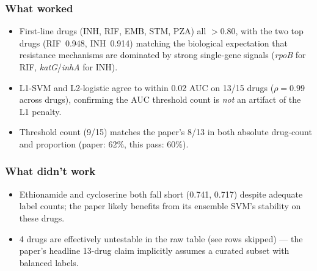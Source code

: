 \documentclass[11pt,letterpaper]{article}
\begin{document}
\subsubsection*{What worked}
\begin{itemize}
  \item First-line drugs (INH, RIF, EMB, STM, PZA) all $>0.80$, with the two
        top drugs (RIF~0.948, INH~0.914) matching the biological expectation
        that resistance mechanisms are dominated by strong single-gene signals
        (\emph{rpoB} for RIF, \emph{katG}/\emph{inhA} for INH).
  \item L1-SVM and L2-logistic agree to within 0.02 AUC on 13/15 drugs
        (\(\rho=0.99\) across drugs), confirming the AUC threshold count is
        \emph{not} an artifact of the L1 penalty.
  \item Threshold count (9/15) matches the paper's 8/13 in both absolute
        drug-count and proportion (paper: 62\%, this pass: 60\%).
\end{itemize}

\subsubsection*{What didn't work}
\begin{itemize}
  \item Ethionamide and cycloserine both fall short (0.741, 0.717) despite
        adequate label counts; the paper likely benefits from its ensemble
        SVM's stability on these drugs.
  \item 4 drugs are effectively untestable in the raw table (see rows
        skipped) --- the paper's headline 13-drug claim implicitly assumes
        a curated subset with balanced labels.
\end{itemize}
\end{document}
